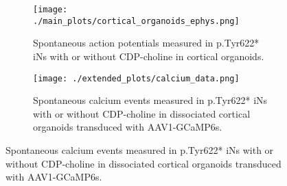 \begin{figure}[H]
	\centering
	\begin{subfigure}[t]{.4\textwidth}
	\caption{Spontaneous action potentials measured in p.Tyr622* iNs with or without CDP-choline in cortical organoids.}
	\texttt{[image: ./main\_plots/cortical\_organoids\_ephys.png]}        
	\end{subfigure} 
	\begin{subfigure}[t]{.4\textwidth}
	\caption{Spontaneous calcium events measured in p.Tyr622* iNs with or without CDP-choline in dissociated cortical organoids transduced with AAV1-GCaMP6s.}
	\texttt{[image: ./extended\_plots/calcium\_data.png]}        
	\end{subfigure} 
\end{figure}

